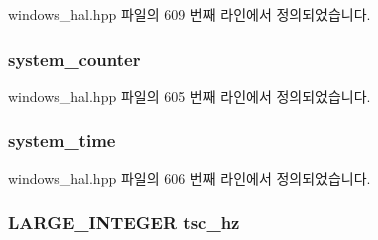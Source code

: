 windows\+\_\+hal.\+hpp 파일의 609 번째 라인에서 정의되었습니다.

\subsubsection[{\texorpdfstring{system\+\_\+counter}{system_counter}}]{ system\+\_\+counter\hspace{0.3cm}{\ttfamily [private]}}\hypertarget{class_windows_wireless_timestamper_a6cb20ab38891e33e6db7431f500b1ff1}{}\label{class_windows_wireless_timestamper_a6cb20ab38891e33e6db7431f500b1ff1}


windows\+\_\+hal.\+hpp 파일의 605 번째 라인에서 정의되었습니다.

\subsubsection[{\texorpdfstring{system\+\_\+time}{system_time}}]{ system\+\_\+time\hspace{0.3cm}{\ttfamily [private]}}\hypertarget{class_windows_wireless_timestamper_a12dbc1e510ed1eb316f94c04fcf7d991}{}\label{class_windows_wireless_timestamper_a12dbc1e510ed1eb316f94c04fcf7d991}


windows\+\_\+hal.\+hpp 파일의 606 번째 라인에서 정의되었습니다.

\subsubsection[{\texorpdfstring{tsc\+\_\+hz}{tsc_hz}}]{\setlength{\rightskip}{0pt plus 5cm}L\+A\+R\+G\+E\+\_\+\+I\+N\+T\+E\+G\+ER tsc\+\_\+hz\hspace{0.3cm}{\ttfamily [private]}}\hypertarget{class_windows_wireless_timestamper_a259066718bc34c6231bbefd0b7093b6e}{}\label{class_windows_wireless_timestamper_a259066718bc34c6231bbefd0b7093b6e}


